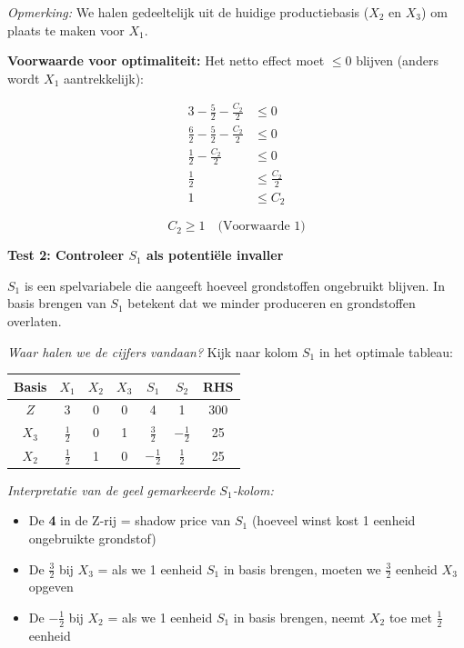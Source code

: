 \documentclass[a4paper,11pt]{article}
\begin{document}
\begin{oefenblok}[title=Productie Optimalisatie bij een Bedrijf]
\textit{Opmerking:} We halen gedeeltelijk uit de huidige productiebasis ($X_2$ en $X_3$) om plaats te maken voor $X_1$.

\textbf{Voorwaarde voor optimaliteit:} Het netto effect moet $\leq 0$ blijven (anders wordt $X_1$ aantrekkelijk):

\begin{align*}
3 - \frac{5}{2} - \frac{C_2}{2} &\leq 0 \\
\frac{6}{2} - \frac{5}{2} - \frac{C_2}{2} &\leq 0 \\
\frac{1}{2} - \frac{C_2}{2} &\leq 0 \\
\frac{1}{2} &\leq \frac{C_2}{2} \\
1 &\leq C_2
\end{align*}

$$\boxed{C_2 \geq 1} \quad \text{(Voorwaarde 1)}$$

\textbf{Test 2: Controleer $S_1$ als potentiële invaller}

$S_1$ is een spelvariabele die aangeeft hoeveel grondstoffen ongebruikt blijven. In basis brengen van $S_1$ betekent dat we minder produceren en grondstoffen overlaten.

\textit{Waar halen we de cijfers vandaan?} Kijk naar kolom $S_1$ in het optimale tableau:

\begin{center}
\begin{tabular}{c|ccccc|c}
\hline
Basis & $X_1$ & $X_2$ & $X_3$ & $S_1$ & $S_2$ & RHS \\
\hline
$Z$ & 3 & 0 & 0 & \cellcolor{yellow!30}4 & 1 & 300 \\
$X_3$ & $\frac{1}{2}$ & 0 & 1 & \cellcolor{yellow!30}$\frac{3}{2}$ & $-\frac{1}{2}$ & 25 \\
$X_2$ & $\frac{1}{2}$ & 1 & 0 & \cellcolor{yellow!30}$-\frac{1}{2}$ & $\frac{1}{2}$ & 25 \\
\hline
\end{tabular}
\end{center}

\textit{Interpretatie van de geel gemarkeerde $S_1$-kolom:}
\begin{itemize}
    \item De \textbf{4} in de Z-rij = shadow price van $S_1$ (hoeveel winst kost 1 eenheid ongebruikte grondstof)
    \item De \textbf{$\frac{3}{2}$} bij $X_3$ = als we 1 eenheid $S_1$ in basis brengen, moeten we $\frac{3}{2}$ eenheid $X_3$ opgeven
    \item De \textbf{$-\frac{1}{2}$} bij $X_2$ = als we 1 eenheid $S_1$ in basis brengen, neemt $X_2$ toe met $\frac{1}{2}$ eenheid
\end{itemize}


\end{oefenblok}
\end{document}
